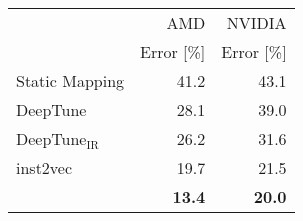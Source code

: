 \centering
\vspace{-.5em}
\footnotesize
\begin{tabular}{l r | r }
	& AMD & NVIDIA \\
	& Error [\%] & Error [\%] \\
	\toprule
	Static Mapping                 & 41.2 & 43.1\\
	DeepTune   & 28.1 & 39.0\\
	DeepTune$_{\text{IR}}$         & 26.2 & 31.6\\
	inst2vec    & 19.7 & 21.5\\
	\programl                       & \textbf{13.4} & 	\textbf{20.0}\\
\end{tabular}
